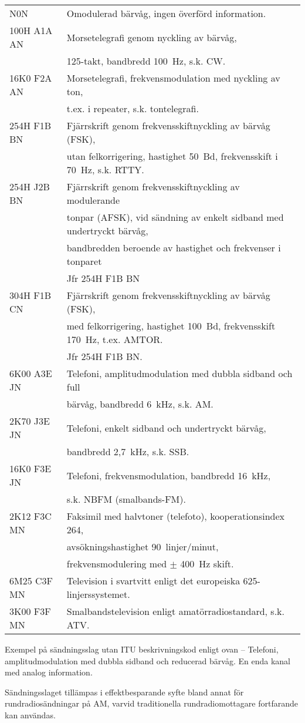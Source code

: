 \begin{tabular}{ll}
	N0N & Omodulerad bärvåg, ingen överförd information.\\
	100H A1A AN & Morsetelegrafi genom nyckling av bärvåg,\\
	& 125-takt, bandbredd 100~Hz, s.k. CW.\\
	16K0 F2A AN & Morsetelegrafi, frekvensmodulation med nyckling av ton,\\
	& t.ex. i repeater, s.k. tontelegrafi.\\
	254H F1B BN & Fjärrskrift genom frekvensskiftnyckling av bärvåg (FSK),\\
	& utan felkorrigering, hastighet 50~Bd, frekvensskift i 70~Hz, s.k. RTTY.\\
	254H J2B BN & Fjärrskrift genom frekvensskiftnyckling av modulerande\\
	& tonpar (AFSK), vid sändning av enkelt sidband med undertryckt bärvåg,\\
	& bandbredden beroende av hastighet och frekvenser i tonparet\\
	& Jfr 254H F1B BN\\
	304H F1B CN & Fjärrskrift genom frekvensskiftnyckling av bärvåg (FSK),\\
	& med felkorrigering, hastighet 100~Bd, frekvensskift 170~Hz, t.ex. AMTOR.\\
	& Jfr 254H F1B BN.\\
	6K00 A3E JN & Telefoni, amplitudmodulation med dubbla sidband och full\\
	& bärvåg, bandbredd 6~kHz, s.k. AM.\\
	2K70 J3E JN & Telefoni, enkelt sidband och undertryckt bärvåg,\\
	& bandbredd 2,7~kHz, s.k. SSB.\\
	16K0 F3E JN & Telefoni, frekvensmodulation, bandbredd 16~kHz,\\
	& s.k. NBFM (smalbands-FM).\\
	2K12 F3C MN & Faksimil med halvtoner (telefoto), kooperationsindex 264,\\
	& avsökningshastighet 90~linjer/minut,\\
	& frekvensmodulering med \(\pm\) 400~Hz skift.\\
	6M25 C3F MN & Television i svartvitt enligt det europeiska 625-linjerssystemet.\\
	3K00 F3F MN & Smalbandstelevision enligt amatörradiostandard, s.k. ATV.\\
\end{tabular}

Exempel på sändningsslag utan ITU beskrivningskod enligt ovan
-- Telefoni, amplitudmodulation med dubbla sidband och reducerad bärvåg.
En enda kanal med analog information.

Sändningsslaget tillämpas i effektbesparande syfte bland annat för
rundradiosändningar på AM, varvid traditionella rundradiomottagare fortfarande
kan användas.

